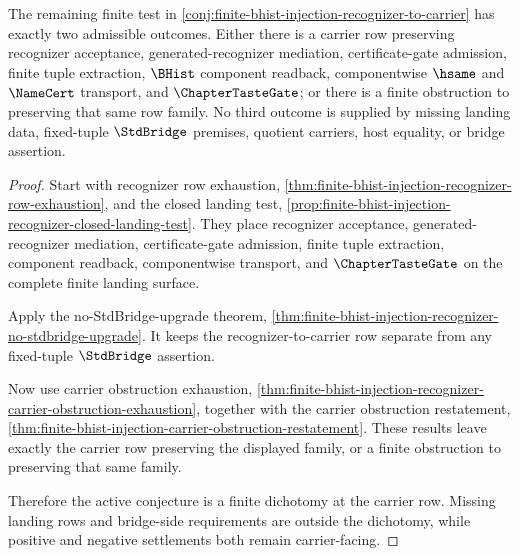 \begin{theorem}
\label{thm:finite-bhist-injection-carrier-row-dichotomy}
The remaining finite test in \autoref{conj:finite-bhist-injection-recognizer-to-carrier} has exactly two admissible outcomes. Either there is a carrier row preserving recognizer acceptance, generated-recognizer mediation, certificate-gate admission, finite tuple extraction, $\BHist$ component readback, componentwise $\hsame$ and $\NameCert$ transport, and $\ChapterTasteGate$; or there is a finite obstruction to preserving that same row family. No third outcome is supplied by missing landing data, fixed-tuple $\StdBridge$ premises, quotient carriers, host equality, or bridge assertion.
\end{theorem}
\begin{proof}
Start with recognizer row exhaustion, \autoref{thm:finite-bhist-injection-recognizer-row-exhaustion}, and the closed landing test, \autoref{prop:finite-bhist-injection-recognizer-closed-landing-test}. They place recognizer acceptance, generated-recognizer mediation, certificate-gate admission, finite tuple extraction, component readback, componentwise transport, and $\ChapterTasteGate$ on the complete finite landing surface.

Apply the no-StdBridge-upgrade theorem, \autoref{thm:finite-bhist-injection-recognizer-no-stdbridge-upgrade}. It keeps the recognizer-to-carrier row separate from any fixed-tuple $\StdBridge$ assertion.

Now use carrier obstruction exhaustion, \autoref{thm:finite-bhist-injection-recognizer-carrier-obstruction-exhaustion}, together with the carrier obstruction restatement, \autoref{thm:finite-bhist-injection-carrier-obstruction-restatement}. These results leave exactly the carrier row preserving the displayed family, or a finite obstruction to preserving that same family.

Therefore the active conjecture is a finite dichotomy at the carrier row. Missing landing rows and bridge-side requirements are outside the dichotomy, while positive and negative settlements both remain carrier-facing.
\end{proof}

